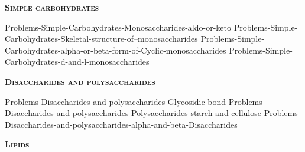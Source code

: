 \documentclass[main.tex]{subfiles}
\begin{document}
\newpage
\setdoublesep{0.35700 em}  %
\setatomsep{1.78500 em}    %
\setbondoffset{0.18265 em} %
\newcommand{\bondwidth}{0.06642 em} %
\setbondstyle{line width = \bondwidth}
\fancyhfoffset[E,O]{0pt}
\setlength{\columnsep}{30pt}
\begin{conclusion}
\end{conclusion}
\begin{multicols*}{2}\setcounter{numA}{1}  %















{\raggedright\textsc{\textbf{Simple carbohydrates}}\par}
 
  {Problems-Simple-Carbohydrates-Monosaccharides-aldo-or-keto}
 {Problems-Simple-Carbohydrates-Skeletal-structure-of--monosaccharides}
 {Problems-Simple-Carbohydrates-alpha-or-beta-form-of-Cyclic-monosaccharides}
 {Problems-Simple-Carbohydrates-d-and-l-monosaccharides}








 
 


{\raggedright\textsc{\textbf{Disaccharides and polysaccharides}}\par}
 {Problems-Disaccharides-and-polysaccharides-Glycosidic-bond}
 {Problems-Disaccharides-and-polysaccharides-Polysaccharides-starch-and-cellulose}
 {Problems-Disaccharides-and-polysaccharides-alpha-and-beta-Disaccharides}








{\raggedright\textsc{\textbf{Lipids}}\par}



\end{multicols*}
\end{document}

